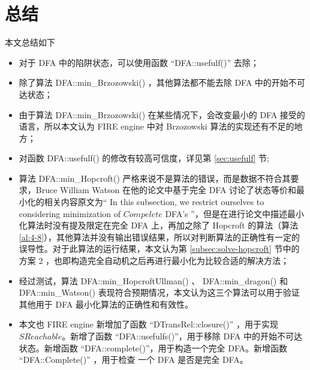 \chapter{总结}

本文总结如下
\begin{itemize}
    \item 对于 DFA 中的陷阱状态，可以使用函数 “DFA::usefulf()” 去除；
    \item 除了算法 DFA::min\_Brzozowski() ，其他算法都不能去除 DFA 中的开始不可达状态；
    \item 由于算法 DFA::min\_Brzozowski() 在某些情况下，会改变最小的 DFA 接受的语言，所以本文认为 FIRE engine 中对 Brzozowski 算法的实现还有不足的地方；
    \item 对函数 DFA::usefulf() 的修改有较高可信度，详见第 \ref{sec:usefulf} 节;
    \item 算法 DFA::min\_Hopcroft() 严格来说不是算法的错误，而是数据不符合其要求，Bruce William Watson 在他的论文\cite[第三节]{watson1993taxonomyb}中基于完全 DFA 讨论了状态等价和最小化的相关内容原文为“ In this subsection, we restrict ourselves to considering minimization of $Compelete$ DFA's ”，但是在进行论文\cite[第四节]{watson1993taxonomyb}中描述最小化算法时没有提及限定在完全 DFA 上，再加之除了 Hopcroft 的算法（算法\ref{al:4-8}），其他算法并没有输出错误结果，所以对判断算法的正确性有一定的误导性。对于此算法的运行结果，本文认为第 \ref{subsec:solve-hopcroft} 节中的方案 2 ，也即构造完全自动机之后再进行最小化为比较合适的解决方法；
    \item 经过测试，算法 DFA::min\_HopcroftUllman() 、 DFA::min\_dragon() 和 DFA::min\_Watson() 表现符合预期情况，本文认为这三个算法可以用于验证其他用于 DFA 最小化算法的正确性和有效性。
    \item 本文也 FIRE engine 新增加了函数 “DTransRel::closure()” ，用于实现 $SReachable$。新增了函数 “DFA::usefulfs()”，用于移除 DFA 中的开始不可达状态。新增函数 “DFA::complete()”，用于构造一个完全 DFA。新增函数 “DFA::Complete()” ，用于检查 一个 DFA 是否是完全 DFA。
\end{itemize}


